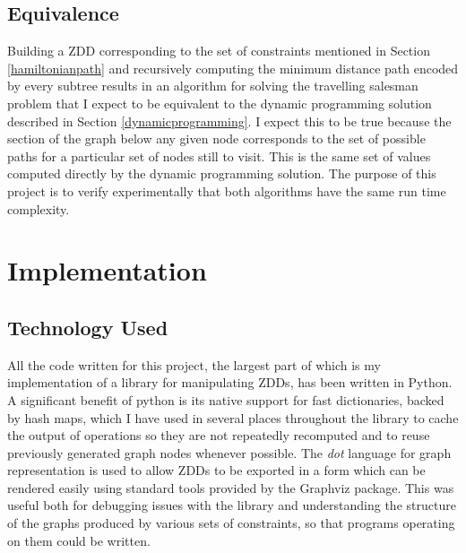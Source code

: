 \documentclass[12pt,a4paper,twoside,openright]{report}
\begin{document}
\section{Equivalence}
Building a ZDD corresponding to the set of constraints mentioned in Section \ref{hamiltonianpath} and recursively computing the minimum distance path encoded by every subtree results in an algorithm for solving the travelling salesman problem that I expect to be equivalent to the dynamic programming solution described in Section \ref{dynamicprogramming}. I expect this to be true because the section of the graph below any given node corresponds to the set of possible paths for a particular set of nodes still to visit. This is the same set of values computed directly by the dynamic programming solution. The purpose of this project is to verify experimentally that both algorithms have the same run time complexity.

\chapter{Implementation}

\section{Technology Used}
All the code written for this project, the largest part of which is my implementation of a library for manipulating ZDDs, has been written in Python. A significant benefit of python is its native support for fast dictionaries, backed by hash maps, which I have used in several places throughout the library to cache the output of operations so they are not repeatedly recomputed and to reuse previously generated graph nodes whenever possible.  The \textit{dot} language for graph representation is used to allow ZDDs to be exported in a form which can be rendered easily using standard tools provided by the Graphviz package. This was useful both for debugging issues with the library and understanding the structure of the graphs produced by various sets of constraints, so that programs operating on them could be written.
\end{document}
